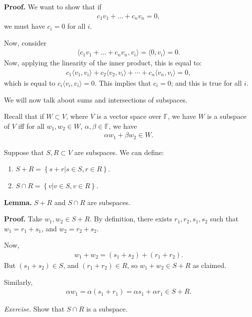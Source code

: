 \documentclass{article}
\newcommand{\la}{\langle}
\newcommand{\ra}{\rangle}
\begin{document}
{\bf Proof.} We want to show that if
\begin{align*}
  c_1 v_1 + \dots + c_n v_n = 0,
\end{align*}
we must have $c_i = 0$ for all $i$.

Now, consider
\begin{align*}
  \la c_1 v_1 + \dots + c_n v_n, v_i \ra = \la 0, v_i \ra = 0.
\end{align*}
Now, applying the linearity of the inner product, this is equal to:
\begin{align*}
  c_1 \la v_1, v_i \ra + c_2 \la v_2, v_i \ra + \cdots + c_n \la v_n, v_i \ra = 0,
\end{align*}
which is equal to $c_i \la v_i, v_i \ra = 0$.  This implies that $c_i = 0$; and this is true for all $i$.

We will now talk about sums and intersections of subspaces.

Recall that if $W \subset V$, where $V$ is a vector space over $\mathbb{F}$, we have $W$ is a subspace of $V$ iff for all $w_1, w_2 \in W$, $\alpha, \beta \in \mathbb{F}$, we have
\begin{align*}
  \alpha w_1 + \beta w_2 \in W.
\end{align*}

Suppose that $S, R \subset V$ are subspaces.  We can define:

\begin{enumerate}
  \item $S + R = \left\{ s + r |  s \in S, r \in R \right\}$.
  \item $S \cap R = \left\{ v | v \in S, v \in R \right\}$.
\end{enumerate}

{\bf Lemma.} $S+R$ and $S \cap R$ are subspaces.

{\bf Proof.} Take $w_1, w_2 \in S+R$.  By definition, there exists $r_1, r_2, s_1, s_2$ such that $w_1 = r_1 + s_1$, and $w_2 = r_2 + s_2$.

Now,
\begin{align*}
  w_1 + w_2 = (s_1 + s_2) + (r_1 + r_2).
\end{align*}
But $(s_1 + s_2) \in S$, and $(r_1 + r_2) \in R$, so $w_1 + w_2 \in S+R$ as claimed.

Similarly,
\begin{align*}
  \alpha w_1 = \alpha (s_1 + r_1) = \alpha s_1 + \alpha r_1 \in S + R.
\end{align*}

{\it Exercise.} Show that $S \cap R$ is a subspace.
\end{document}
